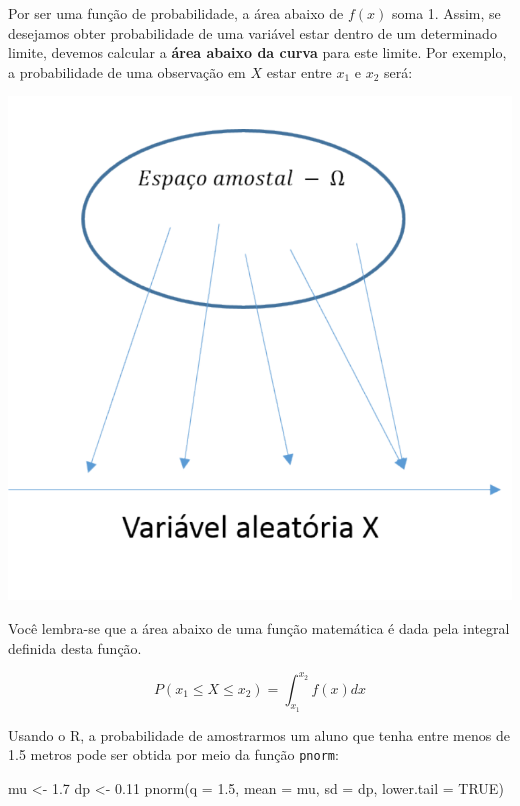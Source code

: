 \documentclass[
]{book}
\newenvironment{Shaded}{\begin{snugshade}}{\end{snugshade}}
\newcommand{\AttributeTok}[1]{\textcolor[rgb]{0.77,0.63,0.00}{#1}}
\newcommand{\ConstantTok}[1]{\textcolor[rgb]{0.00,0.00,0.00}{#1}}
\newcommand{\FloatTok}[1]{\textcolor[rgb]{0.00,0.00,0.81}{#1}}
\newcommand{\FunctionTok}[1]{\textcolor[rgb]{0.00,0.00,0.00}{#1}}
\newcommand{\NormalTok}[1]{#1}
\newcommand{\OtherTok}[1]{\textcolor[rgb]{0.56,0.35,0.01}{#1}}
\begin{document}
Por ser uma função de probabilidade, a área abaixo de \(f(x)\) soma 1. Assim, se desejamos obter probabilidade de uma variável estar dentro de um determinado limite, devemos calcular a \textbf{área abaixo da curva} para este limite. Por exemplo, a probabilidade de uma observação em \(X\) estar entre \(x_1\) e \(x_2\) será:

\begin{center}\includegraphics{probest-cambientais_files/figure-latex/unnamed-chunk-193-1} \end{center}

Você lembra-se que a área abaixo de uma função matemática é dada pela integral definida desta função.

\[P(x_1 \le X \le x_2) = \int_{x_1}^{x_2}f(x) dx\]

Usando o R, a probabilidade de amostrarmos um aluno que tenha entre menos de 1.5 metros pode ser obtida por meio da função \texttt{pnorm}:

\begin{Shaded}
\begin{Highlighting}[]
\NormalTok{mu }\OtherTok{\textless{}{-}} \FloatTok{1.7}
\NormalTok{dp }\OtherTok{\textless{}{-}} \FloatTok{0.11}
\FunctionTok{pnorm}\NormalTok{(}\AttributeTok{q =} \FloatTok{1.5}\NormalTok{, }\AttributeTok{mean =}\NormalTok{ mu, }\AttributeTok{sd =}\NormalTok{ dp, }\AttributeTok{lower.tail =} \ConstantTok{TRUE}\NormalTok{)}
\end{Highlighting}
\end{Shaded}
\end{document}
